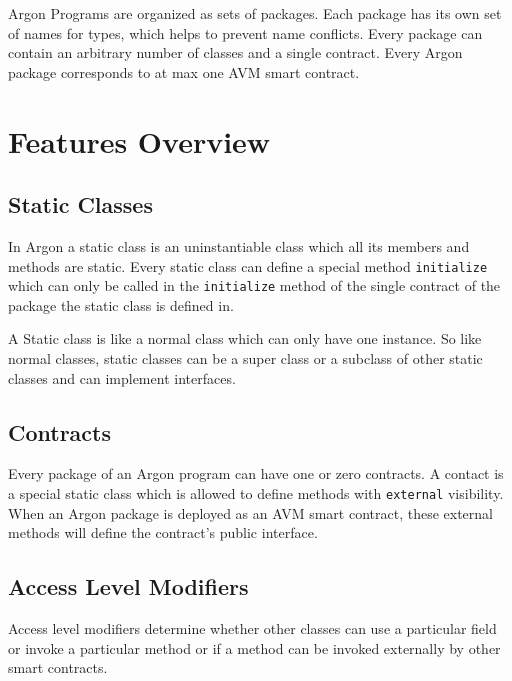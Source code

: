 \documentclass[11pt, a4paper]{report}
\begin{document}
    Argon Programs are organized as sets of packages. Each package has its own set of names for types, which helps
    to prevent name conflicts. Every package can contain an arbitrary number of classes and a single contract. Every
    Argon package corresponds to at max one AVM smart contract.

    \section{Features Overview}\label{sec:features-overview}

    \subsection{Static Classes}\label{subsec:static-classes}

    In Argon a static class is an uninstantiable class which all its members and methods are static. Every static
    class can define a special method \texttt{initialize} which can only be called in the \texttt{initialize}
    method of the single contract of the package the static class is defined in.

    A Static class is like a normal class which can only have one instance. So like normal classes, static classes can
    be a super class or a subclass of other static classes and can implement interfaces.

    \subsection{Contracts}\label{subsec:contract}

    Every package of an Argon program can have one or zero contracts. A contact is a special static class which is
    allowed to define methods with \texttt{external} visibility. When an Argon package is deployed as an AVM smart
    contract, these external methods will define the contract's public interface.

    \subsection{Access Level Modifiers}\label{subsec:access-level-modifiers}

    Access level modifiers determine whether other classes can use a particular field or invoke a particular method or
    if a method can be invoked externally by other smart contracts.
\end{document}
